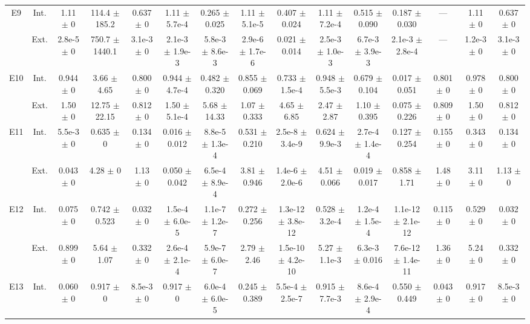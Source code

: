 \begin{table}[htbp]
{\begin{tabular}{@{}ccccccccccccccc@{}}
\cline{2-15}
\multirow{2}{*}{E9} & Int. & 1.11 $\pm$ 0 & 114.4 $\pm$ 185.2 & 0.637 $\pm$ 0 & 1.11 $\pm$ 5.7e-4 & 0.265 $\pm$ 0.025 & 1.11 $\pm$ 5.1e-5 & 0.407 $\pm$ 0.024 & 1.11 $\pm$ 7.2e-4 & 0.515 $\pm$ 0.090 & 0.187 $\pm$ 0.030 & --- & 1.11 $\pm$ 0 & 0.637 $\pm$ 0 \\
 & Ext. & 2.8e-5 $\pm$ 0 & 750.7 $\pm$ 1440.1 & 3.1e-3 $\pm$ 0 & 2.1e-3 $\pm$ 1.9e-3 & 5.8e-3 $\pm$ 8.6e-3 & 2.9e-6 $\pm$ 1.7e-6 & 0.021 $\pm$ 0.014 & 2.5e-3 $\pm$ 1.0e-3 & 6.7e-3 $\pm$ 3.9e-3 & 2.1e-3 $\pm$ 2.8e-4 & --- & 1.2e-3 $\pm$ 0 & 3.1e-3 $\pm$ 0 \\
\cline{2-15}
\multirow{2}{*}{E10} & Int. & 0.944 $\pm$ 0 & 3.66 $\pm$ 4.65 & 0.800 $\pm$ 0 & 0.944 $\pm$ 4.7e-4 & 0.482 $\pm$ 0.320 & 0.855 $\pm$ 0.069 & 0.733 $\pm$ 1.5e-4 & 0.948 $\pm$ 5.5e-3 & 0.679 $\pm$ 0.104 & 0.017 $\pm$ 0.051 & 0.801 $\pm$ 0 & 0.978 $\pm$ 0 & 0.800 $\pm$ 0 \\
 & Ext. & 1.50 $\pm$ 0 & 12.75 $\pm$ 22.15 & 0.812 $\pm$ 0 & 1.50 $\pm$ 5.1e-4 & 5.68 $\pm$ 14.33 & 1.07 $\pm$ 0.333 & 4.65 $\pm$ 6.85 & 2.47 $\pm$ 2.87 & 1.10 $\pm$ 0.395 & 0.075 $\pm$ 0.226 & 0.809 $\pm$ 0 & 1.50 $\pm$ 0 & 0.812 $\pm$ 0 \\
\cline{2-15}
\multirow{2}{*}{E11} & Int. & 5.5e-3 $\pm$ 0 & 0.635 $\pm$ 0 & 0.134 $\pm$ 0 & 0.016 $\pm$ 0.012 & 8.8e-5 $\pm$ 1.3e-4 & 0.531 $\pm$ 0.210 & 2.5e-8 $\pm$ 3.4e-9 & 0.624 $\pm$ 9.9e-3 & 2.7e-4 $\pm$ 1.4e-4 & 0.127 $\pm$ 0.254 & 0.155 $\pm$ 0 & 0.343 $\pm$ 0 & 0.134 $\pm$ 0 \\
 & Ext. & 0.043 $\pm$ 0 & 4.28 $\pm$ 0 & 1.13 $\pm$ 0 & 0.050 $\pm$ 0.042 & 6.5e-4 $\pm$ 8.9e-4 & 3.81 $\pm$ 0.946 & 1.4e-6 $\pm$ 2.0e-6 & 4.51 $\pm$ 0.066 & 0.019 $\pm$ 0.017 & 0.858 $\pm$ 1.71 & 1.48 $\pm$ 0 & 3.11 $\pm$ 0 & 1.13 $\pm$ 0 \\
\cline{2-15}
\multirow{2}{*}{E12} & Int. & 0.075 $\pm$ 0 & 0.742 $\pm$ 0.523 & 0.032 $\pm$ 0 & 1.5e-4 $\pm$ 6.0e-5 & 1.1e-7 $\pm$ 1.2e-7 & 0.272 $\pm$ 0.256 & 1.3e-12 $\pm$ 3.8e-12 & 0.528 $\pm$ 3.2e-4 & 1.2e-4 $\pm$ 1.5e-4 & 1.1e-12 $\pm$ 2.1e-12 & 0.115 $\pm$ 0 & 0.529 $\pm$ 0 & 0.032 $\pm$ 0 \\
 & Ext. & 0.899 $\pm$ 0 & 5.64 $\pm$ 1.07 & 0.332 $\pm$ 0 & 2.6e-4 $\pm$ 2.1e-4 & 5.9e-7 $\pm$ 6.0e-7 & 2.79 $\pm$ 2.46 & 1.5e-10 $\pm$ 4.2e-10 & 5.27 $\pm$ 1.1e-3 & 6.3e-3 $\pm$ 0.016 & 7.6e-12 $\pm$ 1.4e-11 & 1.36 $\pm$ 0 & 5.24 $\pm$ 0 & 0.332 $\pm$ 0 \\
\cline{2-15}
\multirow{2}{*}{E13} & Int. & 0.060 $\pm$ 0 & 0.917 $\pm$ 0 & 8.5e-3 $\pm$ 0 & 0.917 $\pm$ 0 & 6.0e-4 $\pm$ 6.0e-5 & 0.245 $\pm$ 0.389 & 5.5e-4 $\pm$ 2.5e-7 & 0.915 $\pm$ 7.7e-3 & 8.6e-4 $\pm$ 2.9e-4 & 0.550 $\pm$ 0.449 & 0.043 $\pm$ 0 & 0.917 $\pm$ 0 & 8.5e-3 $\pm$ 0 \\

\end{tabular}}
\end{table}
